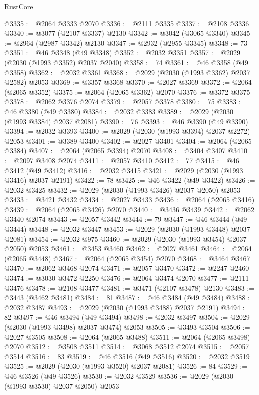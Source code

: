 \begin{lexlean}{RustCore}
\begin{coremodule}
@3335 := @2064 @3333 @2070
@3336 := @2111 @3335
@3337 := @2108 @3336
@3340 := @3077 (@2107 @3337) @2130
@3342 := @3042 (@3065 @3340)
@3345 := @2964 (@2987 @3342) @2130
@3347 := @2932 (@2955 @3345)
@3348 := 73
@3351 := @46 @3348 (@49 @3348)
@3352 := @2032 @3351
@3357 := @2029 (@2030 (@1993 @3352) @2037 @2040)
@3358 := 74
@3361 := @46 @3358 (@49 @3358)
@3362 := @2032 @3361
@3368 := @2029 (@2030 (@1993 @3362) @2037 @2582) @2053
@3369 := @3357 @3368
@3370 := @2027 @3369
@3372 := @2064 (@2065 @3352)
@3375 := @2064 (@2065 @3362) @2070
@3376 := @3372 @3375
@3378 := @2062 @3376 @2074
@3379 := @2057 @3378
@3380 := 75
@3383 := @46 @3380 (@49 @3380)
@3384 := @2032 @3383
@3389 := @2029 (@2030 (@1993 @3384) @2037 @2081)
@3390 := 76
@3393 := @46 @3390 (@49 @3390)
@3394 := @2032 @3393
@3400 := @2029 (@2030 (@1993 @3394) @2037 @2272) @2053
@3401 := @3389 @3400
@3402 := @2027 @3401
@3404 := @2064 (@2065 @3384)
@3407 := @2064 (@2065 @3394) @2070
@3408 := @3404 @3407
@3410 := @2097 @3408 @2074
@3411 := @2057 @3410
@3412 := 77
@3415 := @46 @3412 (@49 @3412)
@3416 := @2032 @3415
@3421 := @2029 (@2030 (@1993 @3416) @2037 @2191)
@3422 := 78
@3425 := @46 @3422 (@49 @3422)
@3426 := @2032 @3425
@3432 := @2029 (@2030 (@1993 @3426) @2037 @2050) @2053
@3433 := @3421 @3432
@3434 := @2027 @3433
@3436 := @2064 (@2065 @3416)
@3439 := @2064 (@2065 @3426) @2070
@3440 := @3436 @3439
@3442 := @2062 @3440 @2074
@3443 := @2057 @3442
@3444 := 79
@3447 := @46 @3444 (@49 @3444)
@3448 := @2032 @3447
@3453 := @2029 (@2030 (@1993 @3448) @2037 @2081)
@3454 := @2032 @975
@3460 := @2029 (@2030 (@1993 @3454) @2037 @2050) @2053
@3461 := @3453 @3460
@3462 := @2027 @3461
@3464 := @2064 (@2065 @3448)
@3467 := @2064 (@2065 @3454) @2070
@3468 := @3464 @3467
@3470 := @2062 @3468 @2074
@3471 := @2057 @3470
@3472 := @2247 @2460
@3474 := @3030 @3472 @2250
@3476 := @2064 @3474 @2070
@3477 := @2111 @3476
@3478 := @2108 @3477
@3481 := @3471 (@2107 @3478) @2130
@3483 := @3443 (@3462 @3481)
@3484 := 81
@3487 := @46 @3484 (@49 @3484)
@3488 := @2032 @3487
@3493 := @2029 (@2030 (@1993 @3488) @2037 @2191)
@3494 := 82
@3497 := @46 @3494 (@49 @3494)
@3498 := @2032 @3497
@3504 := @2029 (@2030 (@1993 @3498) @2037 @3474) @2053
@3505 := @3493 @3504
@3506 := @2027 @3505
@3508 := @2064 (@2065 @3488)
@3511 := @2064 (@2065 @3498) @2070
@3512 := @3508 @3511
@3514 := @3068 @3512 @2074
@3515 := @2057 @3514
@3516 := 83
@3519 := @46 @3516 (@49 @3516)
@3520 := @2032 @3519
@3525 := @2029 (@2030 (@1993 @3520) @2037 @2081)
@3526 := 84
@3529 := @46 @3526 (@49 @3526)
@3530 := @2032 @3529
@3536 := @2029 (@2030 (@1993 @3530) @2037 @2050) @2053

\end{coremodule}
\end{lexlean}
